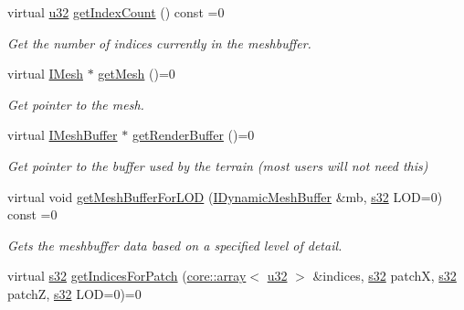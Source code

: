 \begin{DoxyCompactItemize}
virtual \hyperlink{namespaceirr_a0416a53257075833e7002efd0a18e804}{u32} \hyperlink{classirr_1_1scene_1_1ITerrainSceneNode_a0f09a8260f325570ce58f0fc6993aff9}{get\+Index\+Count} () const =0
\begin{DoxyCompactList}\small\item\em Get the number of indices currently in the meshbuffer. \end{DoxyCompactList}\item 
virtual \hyperlink{classirr_1_1scene_1_1IMesh}{I\+Mesh} $\ast$ \hyperlink{classirr_1_1scene_1_1ITerrainSceneNode_a6b5f5fca80e77f392e23d83dc61ae88e}{get\+Mesh} ()=0
\begin{DoxyCompactList}\small\item\em Get pointer to the mesh. \end{DoxyCompactList}\item 
\mbox{\label{classirr_1_1scene_1_1ITerrainSceneNode_a3383e2d453c22c31091ad8652de2bb8a}} 
virtual \hyperlink{classirr_1_1scene_1_1IMeshBuffer}{I\+Mesh\+Buffer} $\ast$ \hyperlink{classirr_1_1scene_1_1ITerrainSceneNode_a3383e2d453c22c31091ad8652de2bb8a}{get\+Render\+Buffer} ()=0
\begin{DoxyCompactList}\small\item\em Get pointer to the buffer used by the terrain (most users will not need this) \end{DoxyCompactList}\item 
virtual void \hyperlink{classirr_1_1scene_1_1ITerrainSceneNode_ae23af8c2066da39ad10714dcf95dd8f1}{get\+Mesh\+Buffer\+For\+L\+OD} (\hyperlink{classirr_1_1scene_1_1IDynamicMeshBuffer}{I\+Dynamic\+Mesh\+Buffer} \&mb, \hyperlink{namespaceirr_ac66849b7a6ed16e30ebede579f9b47c6}{s32} L\+OD=0) const =0
\begin{DoxyCompactList}\small\item\em Gets the meshbuffer data based on a specified level of detail. \end{DoxyCompactList}\item 
virtual \hyperlink{namespaceirr_ac66849b7a6ed16e30ebede579f9b47c6}{s32} \hyperlink{classirr_1_1scene_1_1ITerrainSceneNode_aec6d83c4882fad10a0b35ca5a7ec0935}{get\+Indices\+For\+Patch} (\hyperlink{classirr_1_1core_1_1array}{core\+::array}$<$ \hyperlink{namespaceirr_a0416a53257075833e7002efd0a18e804}{u32} $>$ \&indices, \hyperlink{namespaceirr_ac66849b7a6ed16e30ebede579f9b47c6}{s32} patchX, \hyperlink{namespaceirr_ac66849b7a6ed16e30ebede579f9b47c6}{s32} patchZ, \hyperlink{namespaceirr_ac66849b7a6ed16e30ebede579f9b47c6}{s32} L\+OD=0)=0

\end{DoxyCompactItemize}
